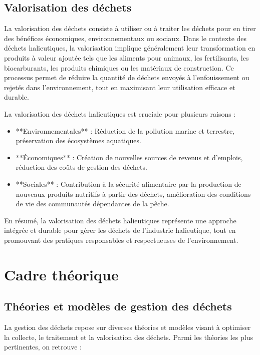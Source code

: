 \documentclass[12pt,a4paper]{report}
\begin{document}
\subsection{Valorisation des déchets}
La valorisation des déchets consiste à utiliser ou à traiter les déchets pour en tirer des bénéfices économiques, environnementaux ou sociaux. Dans le contexte des déchets halieutiques, la valorisation implique généralement leur transformation en produits à valeur ajoutée tels que les aliments pour animaux, les fertilisants, les biocarburants, les produits chimiques ou les matériaux de construction. Ce processus permet de réduire la quantité de déchets envoyés à l'enfouissement ou rejetés dans l'environnement, tout en maximisant leur utilisation efficace et durable.

La valorisation des déchets halieutiques est cruciale pour plusieurs raisons :
\begin{itemize}
    \item **Environnementales** : Réduction de la pollution marine et terrestre, préservation des écosystèmes aquatiques.
    \item **Économiques** : Création de nouvelles sources de revenus et d'emplois, réduction des coûts de gestion des déchets.
    \item **Sociales** : Contribution à la sécurité alimentaire par la production de nouveaux produits nutritifs à partir des déchets, amélioration des conditions de vie des communautés dépendantes de la pêche.
\end{itemize}

En résumé, la valorisation des déchets halieutiques représente une approche intégrée et durable pour gérer les déchets de l'industrie halieutique, tout en promouvant des pratiques responsables et respectueuses de l'environnement.


\section{Cadre théorique}

\subsection{Théories et modèles de gestion des déchets}
La gestion des déchets repose sur diverses théories et modèles visant à optimiser la collecte, le traitement et la valorisation des déchets. Parmi les théories les plus pertinentes, on retrouve :
\end{document}
